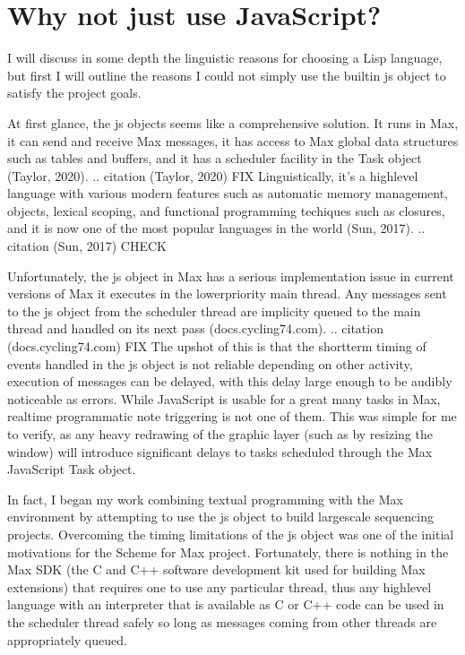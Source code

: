 \documentclass[letterpaper,10pt,english]{sphinxmanual}
\begin{document}
\section{Why not just use JavaScript?}
\label{\detokenize{design:why-not-just-use-javascript}}
\sphinxAtStartPar
I will discuss in some depth the linguistic reasons for choosing a Lisp language, but first I will outline the
reasons I could not simply use the built\sphinxhyphen{}in js object to satisfy the project goals.

\sphinxAtStartPar
At first glance, the js objects seems like a comprehensive solution.
It runs in Max, it can send and receive Max messages, it has access to Max global data structures such as tables and buffers,
and it has a scheduler facility in the Task object (Taylor, 2020).
.. citation (Taylor, 2020) FIX
Linguistically, it’s a high\sphinxhyphen{}level language with various modern features such as automatic memory management,
objects, lexical scoping, and functional programming techiques such as closures, and it is now one of the most popular
languages in the world (Sun, 2017).
.. citation (Sun, 2017) CHECK

\sphinxAtStartPar
Unfortunately, the js object in Max has a serious implementation issue \sphinxhyphen{} in current versions of Max it  executes in the
lower\sphinxhyphen{}priority main thread.  Any messages sent to the js object from the scheduler thread are implicity queued to the
main thread and handled on its next pass (docs.cycling74.com).
.. citation (docs.cycling74.com) FIX
The upshot of this is that the short\sphinxhyphen{}term timing of events handled in the js object is not reliable \sphinxhyphen{}
depending on other activity, execution of messages can be delayed, with this delay large enough to be audibly noticeable as errors.
While JavaScript is usable for a great many tasks in Max, realtime programmatic note triggering is not one of them.
This was simple for me to verify, as any heavy redrawing of the graphic layer (such as by resizing the window) will
introduce significant delays to tasks scheduled through the Max JavaScript Task object.

\sphinxAtStartPar
In fact, I began my work combining textual programming with the Max environment by attempting to use the js object
to build large\sphinxhyphen{}scale sequencing projects.
Overcoming the timing limitations of the js object was one of the initial motivations for the Scheme for Max project.
Fortunately, there is nothing in the Max SDK (the C and C++ software development kit used for building Max extensions) that requires
one to use any particular thread, thus any high\sphinxhyphen{}level language with an interpreter that is available as C or C++ code
can be used in the scheduler thread safely so long as messages coming from other threads are appropriately queued.
\end{document}
